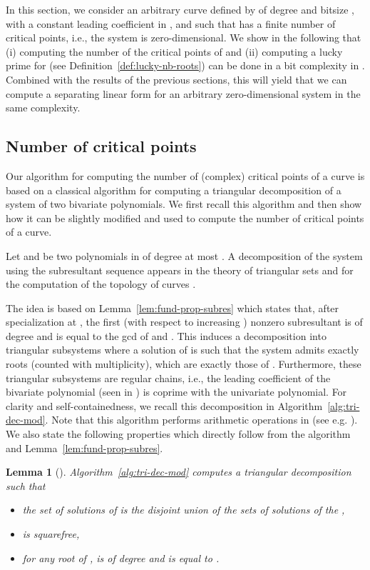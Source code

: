 \documentclass{sig-alternate}
\makeatletter
\newtheorem{lemma}[theorem]{Lemma}
\newcommand{\blue}[1]{\color{blue}#1\color{black}\xspace}
\renewcommand{\blue}[1]{#1\xspace}
\def\cramped                           {\parskip0pt\@topsep0pt       \itemsep0pt\parsep0pt
}
\makeatother
\begin{document}
In this section, we consider an arbitrary curve defined by   of degree  and bitsize
, with a constant leading
coefficient in , and such that  has a finite number of critical points, i.e., the system
 is zero-dimensional. We show in the following that  (i) computing the number of the critical points of
 and (ii) computing a lucky prime for  (see Definition~\ref{def:lucky-nb-roots}) can be done in a bit complexity in . 
Combined with the results of the previous sections, this will yield that we can compute a separating
linear form for an arbitrary zero-dimensional system  in the same complexity.


\subsection{Number of critical points}\label{sec:nb-critical}

Our algorithm for computing  the number of (complex) critical points of a curve is based on  
a classical algorithm for computing a triangular decomposition of
a system of two bivariate polynomials. We first recall this algorithm and then show how it can be slightly modified and used to compute the number of critical points of a curve. 


\smallskip
{}\quad
Let  and  be two polynomials in  of degree at most .
A decomposition  of the system  using the
subresultant sequence appears in the theory of triangular sets
\cite{Li-modpn-11} and for the computation of the topology of curves
\cite{VegKah:curve2d:96}. 


The idea is based on Lemma~\ref{lem:fund-prop-subres} which states that, after
specialization at , the first (with respect to increasing ) nonzero
subresultant  is of degree  and is equal to the
gcd of  and .  This induces a decomposition 
into triangular subsystems   where a solution
 of  is such that the system 
admits exactly  roots (counted with multiplicity), which are exactly those of
.  Furthermore, these triangular subsystems are
regular chains, i.e., the leading coefficient of the bivariate polynomial (seen
in ) is coprime with the univariate polynomial.  For clarity and
self-containedness, we recall this decomposition in
Algorithm~\ref{alg:tri-dec-mod}. 
Note that this algorithm performs  arithmetic operations in  (see e.g. \blue{\cite[Lemma 15]{bouzidiJSC2014a}}).  We also state the following properties which directly follow from the algorithm and Lemma~\ref{lem:fund-prop-subres}.

\begin{lemma}[{\cite{VegKah:curve2d:96,Li-modpn-11}}]\label{lem:tridec-correctness}
   Algorithm~\ref{alg:tri-dec-mod} computes a triangular decomposition 
    such that 

\begin{itemize}\cramped
  \item the set of solutions of  is the disjoint union  of the sets of solutions of the
  , 
  \item  is  squarefree, 
  \item for any root  of ,   
       is of degree  and is equal to   . 
\end{itemize}
\end{lemma}
\end{document}
